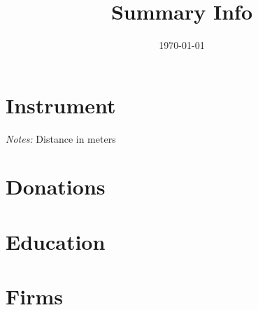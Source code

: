 \documentclass[11pt]{article}
\title{Summary Info}
\date{\today}
\begin{document}


\section{Instrument}

\textit{Notes:} Distance in meters


\clearpage
\section{Donations}












\clearpage
\section{Education}





\section{Firms}


\end{document}
